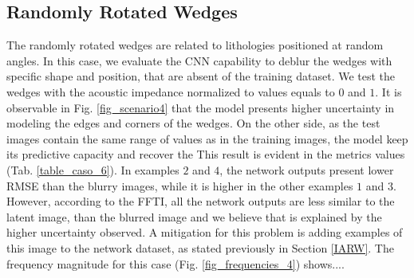 \documentclass[conference]{IEEEtran}
\begin{document}
\subsection{Randomly Rotated Wedges}
The randomly rotated wedges are related to lithologies positioned at random angles.
In this case, we evaluate the CNN capability to deblur the wedges with specific shape and
position, that are absent of the training dataset.
We test the wedges with the acoustic impedance normalized to values equals to $0$ and $1$.
It is observable in Fig. \ref{fig_scenario4} that the model presents higher uncertainty
in modeling the edges and corners of the wedges. On the other side, as the test images contain the same range of values
as in the training images, the model keep its predictive capacity and recover the  This result is evident in the metrics values
(Tab. \ref{table_caso_6}). In examples $2$ and $4$, the network outputs present lower RMSE than the blurry images, 
while it is higher in the other examples $1$ and $3$. However, according to the FFTI, all the network outputs are
less similar to the latent image, than the blurred image and we believe that is explained by the higher uncertainty
observed. A mitigation for this problem is adding examples of this image to the network dataset, as stated previously in
Section \ref{IARW}.
The frequency magnitude for this case (Fig. \ref{fig_frequencies_4}) shows....
\end{document}
